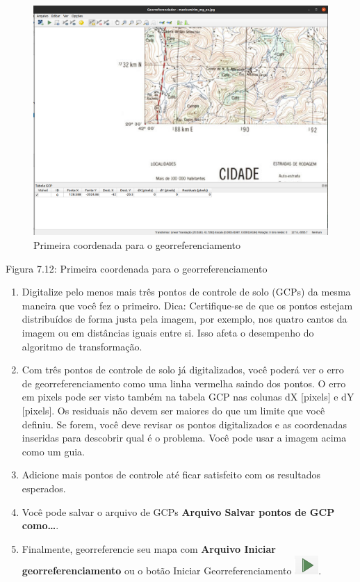 \documentclass[
]{krantz}
\begin{document}
\begin{figure}
\centering
\includegraphics{media/modulo7/georef-3.png}
\caption{Primeira coordenada para o georreferenciamento}
\end{figure}

Figura 7.12: Primeira coordenada para o georreferenciamento

\begin{enumerate}
\def\labelenumi{\arabic{enumi}.}
\setcounter{enumi}{11}
\item
  Digitalize pelo menos mais três pontos de controle de solo (GCPs) da mesma maneira que você fez o primeiro. Dica: Certifique-se de que os pontos estejam distribuídos de forma justa pela imagem, por exemplo, nos quatro cantos da imagem ou em distâncias iguais entre si. Isso afeta o desempenho do algoritmo de transformação.
\item
  Com três pontos de controle de solo já digitalizados, você poderá ver o erro de georreferenciamento como uma linha vermelha saindo dos pontos. O erro em pixels pode ser visto também na tabela GCP nas colunas dX {[}pixels{]} e dY {[}pixels{]}. Os residuais não devem ser maiores do que um limite que você definiu. Se forem, você deve revisar os pontos digitalizados e as coordenadas inseridas para descobrir qual é o problema. Você pode usar a imagem acima como um guia.
\item
  Adicione mais pontos de controle até ficar satisfeito com os resultados esperados.
\item
  Você pode salvar o arquivo de GCPs \textbf{Arquivo Salvar pontos de GCP como\ldots{}}.
\item
  Finalmente, georreferencie seu mapa com \textbf{Arquivo Iniciar georreferenciamento} ou o botão Iniciar Georreferenciamento \includegraphics{media/modulo7/georef-start-btn.png}.
\end{enumerate}
\end{document}
